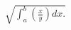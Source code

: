 \documentclass[preview]{standalone}
\begin{document}
\begin{align*}
\sqrt{ \int_{ a}^ {b} \left( \frac{x}{y} \right) dx.}
\end{align*}
\end{document}
